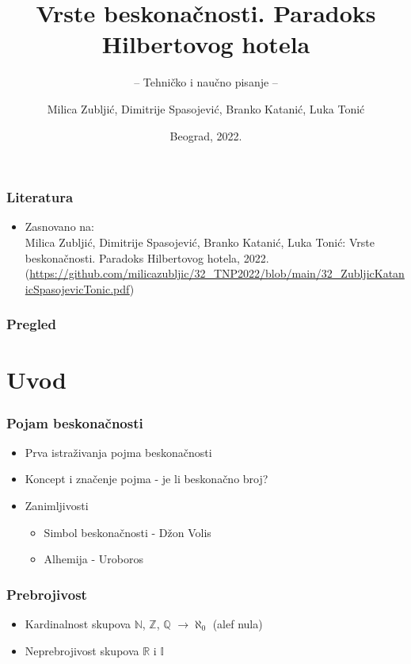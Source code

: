 \documentclass{beamer}
\title{Vrste beskonačnosti. Paradoks Hilbertovog hotela}
\subtitle{-- Tehničko i naučno pisanje --}
\author{Milica Zubljić, Dimitrije Spasojević, Branko Katanić, Luka Tonić}
\institute{Matematički fakultet\\Univerzitet u Beogradu}
\date{
	\footnotesize{Beograd, 2022.}	
}
\begin{document}
\begin{frame}
	\thispagestyle{empty}
	\titlepage
\end{frame}
\addtocounter{framenumber}{-1}
\begin{frame}[fragile]\frametitle{Literatura}
	\begin{itemize}
		\item Zasnovano na:\\

  Milica Zubljić, Dimitrije Spasojević, Branko Katanić, Luka Tonić: Vrste beskonačnosti. Paradoks Hilbertovog hotela, 2022.\\
		(\url{https://github.com/milicazubljic/32_TNP2022/blob/main/32_ZubljicKatanicSpasojevicTonic.pdf})

  \end{itemize}
\end{frame}

\begin{frame}
	\frametitle{Pregled} 
	\tableofcontents[hidesubsections] 
\end{frame}
\section{Uvod}
\begin{frame}
    \frametitle{Pojam beskonačnosti}
    \begin{itemize}
        \item Prva istraživanja pojma beskonačnosti
        \item Koncept i značenje pojma - je li beskonačno broj?
        \item Zanimljivosti
        \begin{itemize}
            \item Simbol beskonačnosti - Džon Volis
            \item Alhemija - Uroboros
        \end{itemize}
    \end{itemize}
\end{frame}
\begin{frame}
    \frametitle{Prebrojivost}
    \begin{itemize}
        \item Kardinalnost skupova $\mathbb{N}$, $\mathbb{Z}$, $\mathbb{Q}$ $\rightarrow \aleph_{0}$ (alef nula)
        \item Neprebrojivost skupova $\mathbb{R}$ i $\mathbb{I}$
    \end{itemize}
\end{frame}
\end{document}
